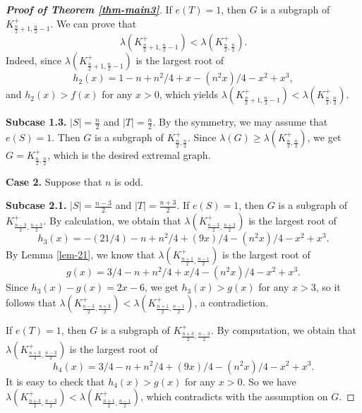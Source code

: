 \documentclass[11pt]{article}
\begin{document}
\begin{proof}[{\bf Proof of Theorem \ref{thm-main3}}]
If $e(T)=1$, then 
$G$ is a subgraph of $K_{\frac{n}{2} +1, \frac{n}{2} -1}^+$. 
We can prove that 
\[  \lambda (K_{\frac{n}{2} +1, \frac{n}{2} -1}^+) < \lambda (K_{\frac{n}{2}, \frac{n}{2} }^+). \]
Indeed, since $\lambda (K_{\frac{n}{2} +1, \frac{n}{2} -1}^+)$ 
 is the largest root of 
 \[ h_2(x) = 1 - n + n^2/4 + x - (n^2 x)/4 - x^2 + x^3,  \]
 and $h_2(x) > f(x)$ for any 
 $x>0$, which yields $\lambda (K_{\frac{n}{2} +1, \frac{n}{2} -1}^+) < \lambda (K_{\frac{n}{2}, \frac{n}{2} }^+)$. 


\medskip  
{\bf Subcase 1.3.}  $|S|= \frac{n}{2} $ and $|T|=\frac{n}{2} $.  
By the symmetry, 
we may assume that $e(S)=1$. 
Then $G$ is a subgraph of $K_{\frac{n}{2} , \frac{n}{2}}^+$. 
Since $\lambda (G) \ge \lambda (K_{\frac{n}{2}, 
\frac{n}{2}}^+)$, we get $G= K_{\frac{n}{2} , \frac{n}{2}}^+$, 
which is the desired extremal graph. 
 

\medskip 
{\bf Case 2.} Suppose that $n$ is odd. 

\medskip 
{\bf Subcase 2.1.}  $|S|= \frac{n-3}{2} $ and $|T|=\frac{n+3}{2}$. 
If $e(S)=1$, then $G$ is a subgraph of $K_{\frac{n-3}{2} , \frac{n+3}{2} }^+$. 
By calculation, we obtain that  $\lambda (K_{\frac{n-3}{2} , \frac{n+3}{2} }^+)$ is the largest root of 
\[ h_3(x) =-(21/4) - n + n^2/4 + (9 x)/4 - (n^2 x)/4 - x^2 + x^3. \]
By Lemma  \ref{lem-21}, 
we know that $\lambda(K_{\frac{n+1}{2}, \frac{n-1}{2}}^+)$
is the largest root of
\[ g(x)=3/4 - n + n^2/4 + x/4 - (n^2 x)/4 - x^2 + x^3. \]
Since $h_3(x)- g(x) = 2x-6$, we get 
$h_3(x) > g(x)$ for any $x>3$, so it follows that 
$\lambda (K_{\frac{n-3}{2} , \frac{n+3}{2} }^+) < 
\lambda(K_{\frac{n+1}{2}, \frac{n-1}{2}}^+)$, a contradiction. 


If $e(T)=1$, then $G$ is a subgraph of $K_{\frac{n+3}{2} , \frac{n-3}{2} }^+$. By computation, we obtain that 
$\lambda (K_{\frac{n+3}{2} , \frac{n-3}{2} }^+)$ is the largest root of 
\[ h_4(x)=3/4 - n + n^2/4 + (9 x)/4 - (n^2 x)/4 - x^2 + x^3.  \]
It is easy to check that $h_4(x) > g(x)$ for any $x>0$. 
So we have $\lambda (K_{\frac{n+3}{2} , \frac{n-3}{2} }^+) < 
\lambda (K_{\frac{n+1}{2} , \frac{n-1}{2} }^+)$, 
which contradicts with the assumption on $G$. 


\end{proof}
\end{document}
